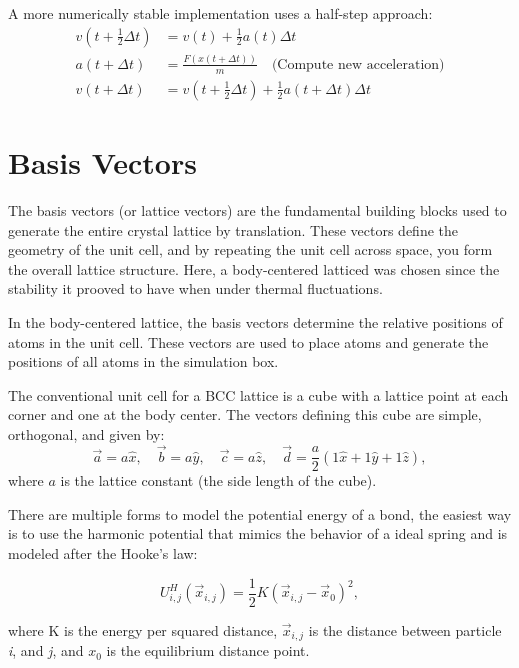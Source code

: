 A more numerically stable implementation uses a half-step approach:
\begin{align}
    v(t+\tfrac{1}{2}\Delta t) &= v(t) + \frac{1}{2}a(t)\Delta t \\
    a(t+\Delta t) &= \frac{F(x(t+\Delta t))}{m} \quad \text{(Compute new acceleration)} \\
    v(t+\Delta t) &= v(t+\tfrac{1}{2}\Delta t) + \frac{1}{2}a(t+\Delta t)\Delta t
    \label{eq:vv_velocity_halfstep}
\end{align}

\section{Basis Vectors}

The basis vectors (or lattice vectors) are the fundamental building blocks used to generate the entire crystal lattice by translation. These vectors define the geometry of the unit cell, and by repeating the unit cell across space, you form the overall lattice structure. Here, a body-centered latticed was chosen since the stability it prooved to have when under thermal fluctuations.

In the body-centered lattice, the basis vectors determine the relative positions of atoms in the unit cell. These vectors are used to place atoms and generate the positions of all atoms in the simulation box.


The conventional unit cell for a BCC lattice is a cube with a lattice point at each corner and one at the body center. The vectors defining this cube are simple, orthogonal, and given by:
%
\begin{equation}
  \vec{a} = a\hat{x}, \quad \vec{b} = a\hat{y}, \quad \vec{c} = a\hat{z}, \quad \vec{d} = \frac{a}{2}\left(  1\hat{x} +  1\hat{y} + 1\hat{z} \right), 
\end{equation}
%
where \( a \) is the lattice constant (the side length of the cube).

There are multiple forms to model the potential energy of a bond, the easiest way is to use the harmonic potential that mimics the behavior of a ideal spring and is modeled after the Hooke's law:

\begin{equation}
  U^{H}_{i,j}(\vec{x}_{i,j}) = \frac{1}{2}K(\vec{x}_{i,j} - \vec{x}_0)^2,
\end{equation}

where K is the energy per squared distance, $\vec{x}_{i,j}$ is the distance between particle \textit{i}, and \textit{j}, and $x_0$ is the equilibrium distance point.

